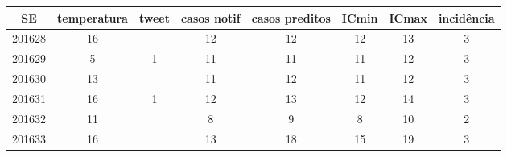 \begin{tabular}{c|ccccccc}
  \hline
SE & temperatura & tweet & casos notif & casos preditos & ICmin & ICmax & incidência \\ 
  \hline
201628 & 16 &  & 12 & 12 & 12 & 13 & 3 \\ 
  201629 & 5 & 1 & 11 & 11 & 11 & 12 & 3 \\ 
  201630 & 13 &  & 11 & 12 & 11 & 12 & 3 \\ 
  201631 & 16 & 1 & 12 & 13 & 12 & 14 & 3 \\ 
  201632 & 11 &  & 8 & 9 & 8 & 10 & 2 \\ 
  201633 & 16 &  & 13 & 18 & 15 & 19 & 3 \\ 
   \hline
\end{tabular}
